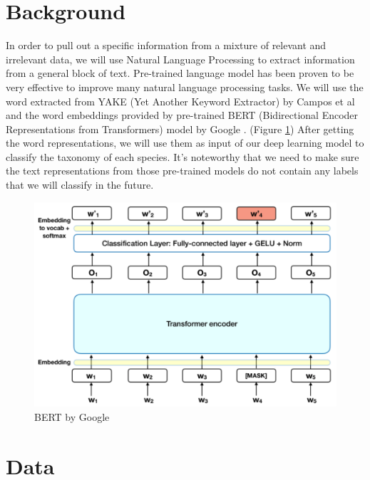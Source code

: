 \documentclass[10pt,twocolumn,letterpaper]{article}
\begin{document}
\section{Background}

    In order to pull out a specific information from a mixture of relevant and irrelevant data, we will use Natural Language Processing to extract information from a general block of text. Pre-trained language model has been proven to be very effective to improve many natural language processing tasks. We will use the word extracted from YAKE (Yet Another Keyword Extractor) by Campos et al \cite{article} and the word embeddings provided by pre-trained BERT (Bidirectional Encoder Representations from Transformers) model by Google \cite{devlin2018bert}. (Figure \ref{fig:bert_des}) After getting the word representations, we will use them as input of our deep learning model to classify the taxonomy of each species. It's noteworthy that we need to make sure the text representations from those pre-trained models do not contain any labels that we will classify in the future.

    \begin{figure}
        \includegraphics[width=\linewidth]{bert_des.png}
        \caption{BERT by Google}
        \label{fig:bert_des}
    \end{figure}
\section{Data}
\end{document}
